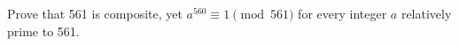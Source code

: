 Prove that 561 is composite, yet $a^{560}\equiv1\pmod{561}$ for every integer $a$ relatively prime to 561.
